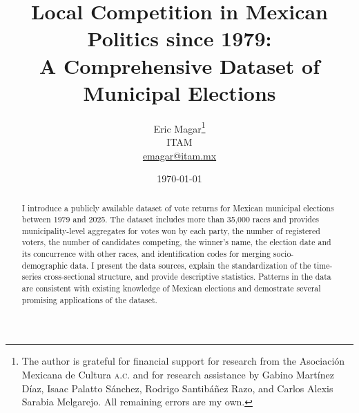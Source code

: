 \documentclass[letter,12pt]{article}
\begin{document}
\title{Local Competition in Mexican Politics since 1979: \\ A Comprehensive Dataset of Municipal Elections}
\author{Eric Magar\footnote{The author is grateful for financial support for research from the Asociación Mexicana de Cultura \textsc{a.c.} and for research assistance by Gabino Martínez Díaz, Isaac Palatto Sánchez, Rodrigo Santibáñez Razo, and Carlos Alexis Sarabia Melgarejo. All remaining errors are my own.} \\ ITAM \\ \url{emagar@itam.mx}}
\date{\today}
\maketitle

\begin{abstract}
\noindent I introduce a publicly available dataset of vote returns for Mexican municipal elections between 1979 and 2025. The dataset includes more than 35,000 races and provides municipality-level aggregates for votes won by each party, the number of registered voters, the number of candidates competing, the winner's name, the election date and its concurrence with other races, and identification codes for merging socio-demographic data. I present the data sources, explain the standardization of the time-series cross-sectional structure, and provide descriptive statistics. Patterns in the data are consistent with existing knowledge of Mexican elections and demostrate several promising applications of the dataset.
\end{abstract}


\end{document}
